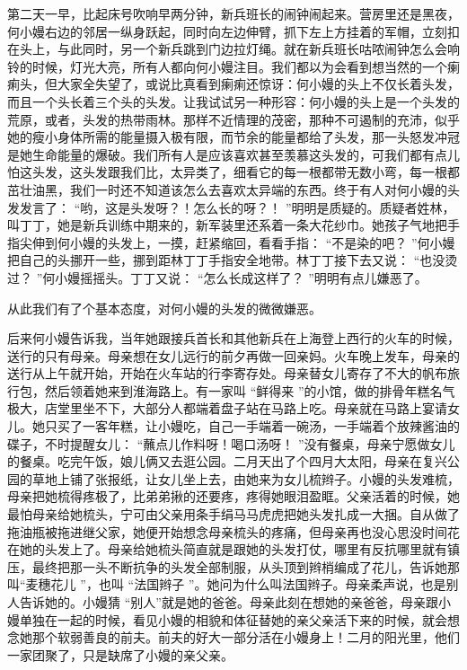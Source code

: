 \documentclass[12pt,twoside,openany]{book}
\begin{document}
第二天一早，比起床号吹响早两分钟，新兵班长的闹钟闹起来。营房里还是黑夜，何小嫚右边的邻居一纵身跃起，同时向左边伸臂，抓下左上方挂着的军帽，立刻扣在头上，与此同时，另一个新兵跳到门边拉灯绳。就在新兵班长咕哝闹钟怎么会响铃的时候，灯光大亮，所有人都向何小嫚注目。我们都以为会看到想当然的一个瘌痢头，但大家全失望了，或说比真看到瘌痢还惊讶：何小嫚的头上不仅长着头发，而且一个头长着三个头的头发。让我试试另一种形容：何小嫚的头上是一个头发的荒原，或者，头发的热带雨林。那样不近情理的茂密，那种不可遏制的充沛，似乎她的瘦小身体所需的能量摄入极有限，而节余的能量都给了头发，那一头怒发冲冠是她生命能量的爆破。我们所有人是应该喜欢甚至羡慕这头发的，可我们都有点儿怕这头发，这头发跟我们比，太异类了，细看它的每一根都带无数小弯，每一根都茁壮油黑，我们一时还不知道该怎么去喜欢太异端的东西。终于有人对何小嫚的头发发言了： “哟，这是头发呀？！怎么长的呀？！ ”明明是质疑的。质疑者姓林，叫丁丁，她是新兵训练中期来的，新军装里还系着一条大花纱巾。她孩子气地把手指尖伸到何小嫚的头发上，一摸，赶紧缩回，看看手指： “不是染的吧？ ”何小嫚把自己的头挪开一些，挪到距林丁丁手指安全地带。林丁丁接下去又说： “也没烫过？ ”何小嫚摇摇头。丁丁又说： “怎么长成这样了？ ”明明有点儿嫌恶了。

从此我们有了个基本态度，对何小嫚的头发的微微嫌恶。

后来何小嫚告诉我，当年她跟接兵首长和其他新兵在上海登上西行的火车的时候，送行的只有母亲。母亲想在女儿远行的前夕再做一回亲妈。火车晚上发车，母亲的送行从上午就开始，开始在火车站的行李寄存处。母亲替女儿寄存了不大的帆布旅行包，然后领着她来到淮海路上。有一家叫 “鲜得来 ”的小馆，做的排骨年糕名气极大，店堂里坐不下，大部分人都端着盘子站在马路上吃。母亲就在马路上宴请女儿。她只买了一客年糕，让小嫚吃，自己一手端着一碗汤，一手端着个放辣酱油的碟子，不时提醒女儿： “蘸点儿作料呀！喝口汤呀！ ”没有餐桌，母亲宁愿做女儿的餐桌。吃完午饭，娘儿俩又去逛公园。二月天出了个四月大太阳，母亲在复兴公园的草地上铺了张报纸，让女儿坐上去，由她来为女儿梳辫子。小嫚的头发难梳，母亲把她梳得疼极了，比弟弟揪的还要疼，疼得她眼泪盈眶。父亲活着的时候，她最怕母亲给她梳头，宁可由父亲用条手绢马马虎虎把她头发扎成一大捆。自从做了拖油瓶被拖进继父家，她便开始想念母亲梳头的疼痛，但母亲再也没心思没时间花在她的头发上了。母亲给她梳头简直就是跟她的头发打仗，哪里有反抗哪里就有镇压，最终把那一头不断抗争的头发全部制服，从头顶到辫梢编成了花儿，告诉她那叫“麦穗花儿 ”，也叫 “法国辫子 ”。她问为什么叫法国辫子。母亲柔声说，也是别人告诉她的。小嫚猜 “别人”就是她的爸爸。母亲此刻在想她的亲爸爸，母亲跟小嫚单独在一起的时候，看见小嫚的相貌和体征替她的亲父亲活下来的时候，就会想念她那个软弱善良的前夫。前夫的好大一部分活在小嫚身上！二月的阳光里，他们一家团聚了，只是缺席了小嫚的亲父亲。
\end{document}
